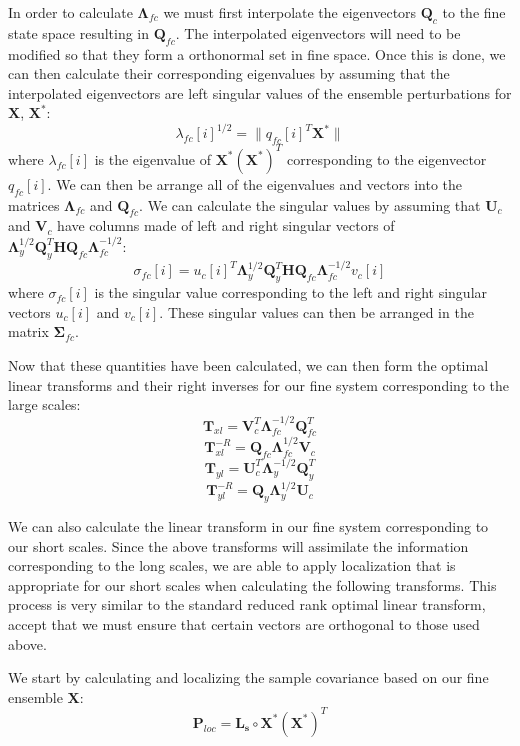 \documentclass[11pt]{article} %
\newcommand{\mat}{\mathbf}
\begin{document}
In order to calculate $\mat{\Lambda}_{fc}$ we must first interpolate
the eigenvectors $\mat{Q}_c$ to the fine state space resulting in
$\mat{Q}_{fc}$.
The interpolated eigenvectors will need to be modified so that they
form a orthonormal set in fine space.
Once this is done, we can then calculate their corresponding
eigenvalues by assuming that the interpolated eigenvectors are left
singular values of the ensemble perturbations for $\mat{X}$,
$\mat{X}^*$:
\[
  \lambda_{fc}[i]^{1/2} = \lVert q_{fc}[i]^T \mat{X}^* \rVert
\]
where $\lambda_{fc}[i]$ is the eigenvalue of $\mat{X}^*\left(
  \mat{X}^* \right)^T$ corresponding to the eigenvector $q_{fc}[i]$.
We can then be arrange all of the eigenvalues and vectors into the
matrices $\mat{\Lambda}_{fc}$ and $\mat{Q}_{fc}$.
We can calculate the singular values by assuming that $\mat{U}_c$
and $\mat{V}_c$ have columns made of left and right singular vectors
of $\mat{\Lambda}_y^{1/2} \mat{Q}_y^T \mat{H} \mat{Q}_{fc}
\mat{\Lambda}_{fc}^{-1/2}$:
\[
  \sigma_{fc}[i] = u_c[i]^T \mat{\Lambda}_y^{1/2}
\mat{Q}_y^T \mat{H} \mat{Q}_{fc} \mat{\Lambda}_{fc}^{-1/2} v_{c}[i]
\]
where $\sigma_{fc}[i]$ is the singular value corresponding to the left
and right singular vectors $u_c[i]$ and $v_c[i]$.
These singular values can then be arranged in the matrix
$\mat{\Sigma}_{fc}$.

Now that these quantities have been calculated, we can then form the
optimal linear transforms and their right inverses for our fine system
corresponding to the large scales:
\[
  \mat{T}_{xl} = \mat{V}_c^T \mat{\Lambda}_{fc}^{-1/2} \mat{Q}_{fc}^T
\]
\[
  \mat{T}_{xl}^{-R} = \mat{Q}_{fc} \mat{\Lambda}_{fc}^{1/2} \mat{V}_c
\]
\[
  \mat{T}_{yl} = \mat{U}_c^T \mat{\Lambda}_{y}^{-1/2} \mat{Q}_{y}^T
\]
\[
  \mat{T}_{yl}^{-R} = \mat{Q}_{y} \mat{\Lambda}_{y}^{1/2} \mat{U}_c
\]

We can also calculate the linear transform in our fine system
corresponding to our short scales.
Since the above transforms will assimilate the information
corresponding to the long scales, we are able to apply localization
that is appropriate for our short scales when calculating the
following transforms.
This process is very similar to the standard reduced rank optimal
linear transform, accept that we must ensure that certain vectors are
orthogonal to those used above.

We start by calculating and localizing the sample covariance based on
our fine ensemble $\mat{X}$:
\[
  \mat{P}_{loc} = \mat{L_s} \circ \mat{X}^* \left( \mat{X}^* \right)^T
\]
\end{document}
